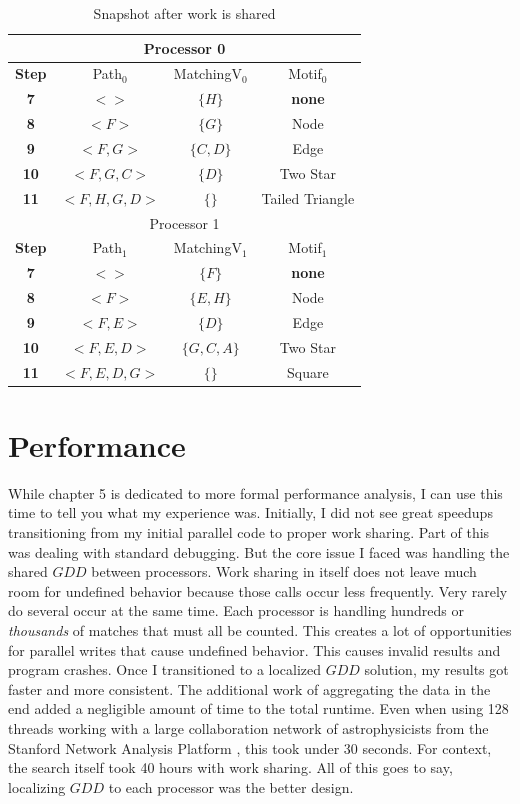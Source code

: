 \documentclass[12pt,twoside]{reedthesis}
\begin{document}
\begin{table}[h!]
\begin{tabular}{ |c| c c c |  }
	 \hline
 	\multicolumn{4}{|c|}{Processor 0}  \\
 	\hline
	 \textbf{Step} & Path$_{0}$ & MatchingV$_{0}$ & Motif$_{0}$\\
	 \hline
	 \textbf{7}&$<  >$ & $\{H\}$ & \textbf{none} \\
	 \textbf{8}&$<F>$ & $\{G\}$ & Node \\
	 \textbf{9}&$<F,G>$ & $\{C,D\}$ & Edge \\
	 \textbf{10}&$<F,G,C>$ & $\{D\}$ & Two Star \\
	 \textbf{11}&$<F,H,G,D>$ & $\{\}$ & Tailed Triangle \\
 	\hline
	\hline
	\multicolumn{4}{|c|}{Processor 1} \\
	\hline
	\textbf{Step} & Path$_{1}$ & MatchingV$_{1}$ & Motif$_{1}$\\
	\hline
	 \textbf{7}& $<  >$ & $\{F\}$ & \textbf{none} \\
	 \textbf{8}& $<F>$ & $\{E,H\}$ & Node \\
	\textbf{9} & $<F,E>$ & $\{D\}$ & Edge \\
	 \textbf{10} & $<F,E,D>$ & $\{G,C,A\}$ & Two Star \\
	 \textbf{11} & $<F,E,D,G>$ & $\{\}$ & Square\\
	 \hline
\end{tabular}
 \caption{Snapshot after work is shared}
\label{table:par_shared}
\end{table}

\section{Performance}
While chapter 5 is dedicated to more formal performance analysis, I can use this time to tell you what my experience was. Initially, I did not see great speedups transitioning from my initial parallel code to proper work sharing. Part of this was dealing with standard debugging. But the core issue I faced was handling the shared $GDD$ between processors. Work sharing in itself does not leave much room for undefined behavior because those calls occur less frequently. Very rarely do several occur at the same time. Each processor is handling hundreds or \textit{thousands} of matches that must all be counted. This creates a lot of opportunities for parallel writes that cause undefined behavior. This causes invalid results and program crashes. Once I transitioned to a localized $GDD$ solution, my results got faster and more consistent. The additional work of aggregating the data in the end added a negligible amount of time to the total runtime. Even when using 128 threads working with a large collaboration network of astrophysicists from the Stanford Network Analysis Platform \cite{snap}, this took under 30 seconds. For context, the search itself took 40 hours with work sharing. All of this goes to say, localizing $GDD$ to each processor was the better design.
\end{document}
